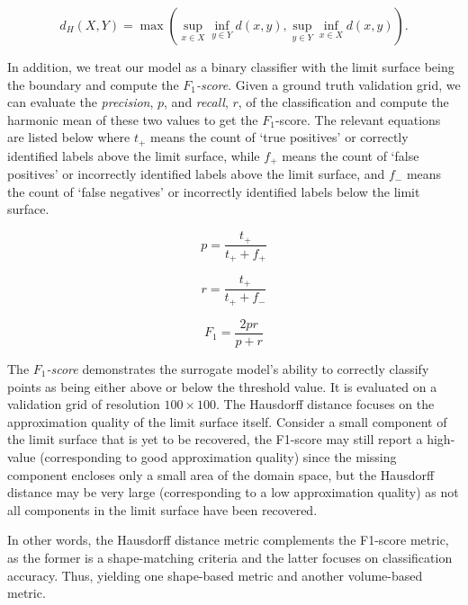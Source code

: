 \begin{equation}
d_H(X,Y) = \max \left( \sup_{x \in X} \inf_{y \in Y}
d(x,y),\sup_{y \in Y} \inf_{x \in X} d(x,y)\right).
\end{equation}

In addition, we treat our model as a binary classifier with the limit surface being the boundary and compute the \emph{$F_1$-score}.
%
Given a ground truth validation grid, we can evaluate the \emph{precision}, $p$, and \emph{recall}, $r$, of the classification and compute the harmonic mean of these two values to get the $F_1$-score.
%
The relevant equations are listed below where $t_+$ means the count of `true positives' or correctly identified labels above the limit surface, while $f_+$ means the count of `false positives' or incorrectly identified labels above the limit surface, and $f_-$ means the count of `false negatives' or incorrectly identified labels below the limit surface.

\begin{equation}
p = \frac{t_+}{t_+ + f_+}
\end{equation}

\begin{equation}
r = \frac{t_+}{t_+ + f_-}
\end{equation}

\begin{equation}
F_1 = \frac{2pr}{p+r}
\end{equation}


The \emph{$F_1$-score} demonstrates the surrogate model's ability to correctly classify points as being either above or below the threshold value.
%
It is evaluated on a validation grid of resolution $100\times100$.
%
The Hausdorff distance focuses on the approximation quality of the limit surface itself.
%
Consider a small component of the limit surface that is yet to be recovered, the F1-score may still report a high-value (corresponding to good approximation quality) since the missing component encloses only a small area of the domain space, but the Hausdorff distance may be very large (corresponding to a low approximation quality) as not all components in the limit surface have been recovered.

In other words, the Hausdorff distance metric complements the F1-score metric, as the former is a shape-matching criteria and the latter focuses on classification accuracy. Thus, yielding one shape-based metric and another volume-based metric.

